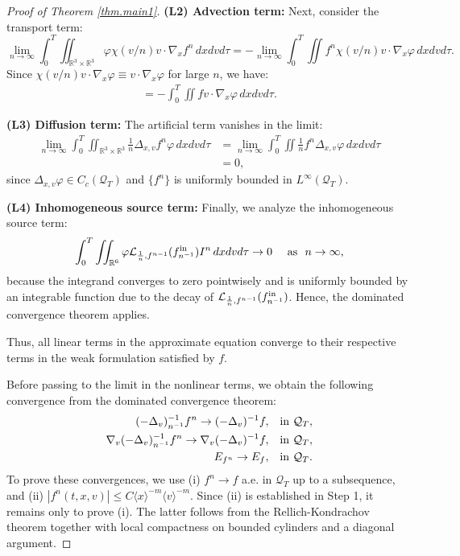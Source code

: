 \documentclass[reqno,11pt,final]{amsart}
\theoremstyle{plain}
\numberwithin{equation}{section}
\numberwithin{theorem}{section}
\begin{document}
\begin{proof}[Proof of Theorem \ref{thm.main1}]
\noindent\textbf{(L2) Advection term:} Next, consider the transport term:$$
\lim_{n\to\infty} \int_0^T \iint_{\mathbb{R}^3\times\mathbb{R}^3} \varphi \chi(v/n)v\cdot\nabla_xf^n\,dxdvd\tau 
= - \lim_{n\to\infty} \int_0^T \iint f^n \chi(v/n)v\cdot\nabla_x\varphi\,dxdvd\tau.$$Since $\chi(v/n)v\cdot\nabla_x\varphi \equiv v\cdot\nabla_x\varphi$ for large $n$, we have:
\begin{align*}
= -\int_0^T\iint fv\cdot\nabla_x\varphi\,dxdvd\tau.
\end{align*}

\noindent\textbf{(L3) Diffusion term: }The artificial term vanishes in the limit:
\begin{align*}
\lim_{n\to\infty} \int_0^T \iint_{\mathbb{R}^3\times\mathbb{R}^3} \frac{1}{n}\Delta_{x,v}f^n \varphi\,dxdvd\tau &= \lim_{n\to\infty} \int_0^T \iint \frac{1}{n}f^n \Delta_{x,v}\varphi\,dxdvd\tau\\
&=0,
\end{align*}since $\Delta_{x,v}\varphi\in C_c(\mathcal{Q}_T)$ and $\{f^n\}$ is uniformly bounded in $L^\infty(\mathcal{Q}_T)$.

\noindent\textbf{(L4) Inhomogeneous source term: }Finally, we analyze the inhomogeneous source term:
\begin{align*}
\int_0^T \iint_{\mathbb{R}^6} \varphi \mathcal{L}_{\frac{1}{n}, f^{n-1}}(f^\textup{in}_{n^{-1}})I^n\,dxdvd\tau \to 0 \quad \textup{ as }\,\,n\to\infty,
\end{align*}because the integrand converges to zero pointwisely and is uniformly bounded by an integrable function due to the decay of $\mathcal{L}_{\frac{1}{n}, f^{n-1}}(f^\textup{in}_{n^{-1}})$. Hence, the dominated convergence theorem applies.

Thus, all linear terms in the approximate equation converge to their respective terms in the weak formulation satisfied by $f$.

Before passing to the limit in the nonlinear terms, we obtain the following convergence from the dominated convergence theorem:
\begin{align}
(-\Delta_v)_{n^{-1}}^{-1}f^n \to (-\Delta_v)^{-1}f, \quad &\textup{in }\mathcal{Q}_T,\label{inv Lapl lim}\\
\nabla_v(-\Delta_v)_{n^{-1}}^{-1}f^n \to \nabla_v(-\Delta_v)^{-1}f, \quad &\textup{in }\mathcal{Q}_T,\label{d in Lapl limit}\\
E_{f^n} \to E_f, \quad &\textup{in }\mathcal{Q}_T.\label{E lim}
\end{align}To prove these convergences, we use (i) $f^n \to f$ a.e. in $\mathcal{Q}_T$ up to a subsequence, and (ii) $|f^n(t,x,v)|\le C\langle x\rangle^{-m}\langle v\rangle^{-m}$. Since (ii) is established in Step 1, it remains only to prove (i). The latter follows from the Rellich-Kondrachov theorem together with local compactness on bounded cylinders and a diagonal argument.


\end{proof}
\end{document}
